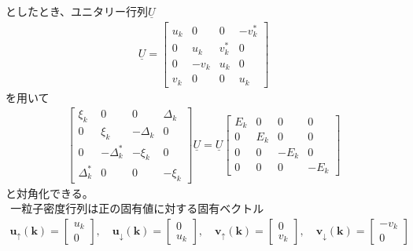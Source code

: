 \documentclass[dvipdfmx, 11pt, a4paper]{jsarticle}
\numberwithin{equation}{section}
\theoremstyle{definition}
\begin{document}
    としたとき、ユニタリー行列$\underline{U}$
    \begin{align}
        \underline{U} = \left[
        \begin{matrix}
            u_k&0&0&-v_k^*\\
            0&u_k&v_k^*&0\\
            0&-v_k&u_k&0\\
            v_k&0&0&u_k
        \end{matrix}
        \right]
    \end{align}
    を用いて
    \begin{align}
        \left[
        \begin{matrix}
            \xi_k&0&0&\Delta_k\\
            0&\xi_k&-\Delta_k&0\\
            0&-\Delta_k^*&-\xi_k&0\\
            \Delta_k^*&0&0&-\xi_k
        \end{matrix}
        \right] \underline{U} = \underline{U}
        \left[ 
        \begin{matrix}
            E_k&0&0&0\\
            0&E_k&0&0\\
            0&0&-E_k&0\\
            0&0&0&-E_k
        \end{matrix}
        \right]
    \end{align}
    と対角化できる。\\
    $\ \ $一粒子密度行列は正の固有値に対する固有ベクトル
    \begin{align}
        \bm{u}_\uparrow(\bm{k}) =
        \left[ 
        \begin{matrix}
            u_k\\
            0
        \end{matrix}
        \right],\quad
        \bm{u}_\downarrow(\bm{k}) =
        \left[ 
        \begin{matrix}
            0\\
            u_k
        \end{matrix}
        \right],\quad
        \bm{v}_\uparrow(\bm{k}) =
        \left[ 
        \begin{matrix}
            0\\
            v_k
        \end{matrix}
        \right],\quad
        \bm{v}_\downarrow(\bm{k}) =
        \left[ 
        \begin{matrix}
            -v_k\\
            0
        \end{matrix}
        \right]
    \end{align}
\end{document}
